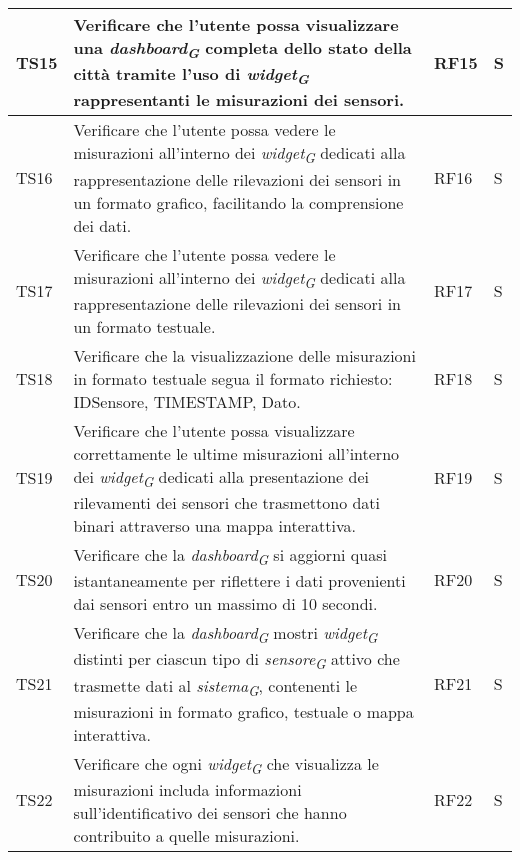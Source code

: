 \begin{longtable}{|C{1.9cm}|L{5cm}|C{2cm}|C{2cm}|}
    TS15 & Verificare che l'utente possa visualizzare una \textit{dashboard}\textsubscript{\textit{G}} completa dello stato della città tramite l'uso di \textit{widget}\textsubscript{\textit{G}} rappresentanti le misurazioni dei sensori. & RF15 & S \\
    \hline

    TS16 & Verificare che l'utente possa vedere le misurazioni all'interno dei \textit{widget}\textsubscript{\textit{G}} dedicati alla rappresentazione delle rilevazioni dei sensori in un formato grafico, facilitando la comprensione dei dati. & RF16 & S \\
    \hline

    TS17 & Verificare che l'utente possa vedere le misurazioni all'interno dei \textit{widget}\textsubscript{\textit{G}} dedicati alla rappresentazione delle rilevazioni dei sensori in un formato testuale. & RF17 & S \\
    \hline

    TS18 & Verificare che la visualizzazione delle misurazioni in formato testuale segua il formato richiesto: IDSensore, TIMESTAMP, Dato. & RF18 & S \\
    \hline

    TS19 & Verificare che l'utente possa visualizzare correttamente le ultime misurazioni all'interno dei \textit{widget}\textsubscript{\textit{G}} dedicati alla presentazione dei rilevamenti dei sensori che trasmettono dati binari attraverso una mappa interattiva. & RF19 & S \\
    \hline

    TS20 & Verificare che la \textit{dashboard}\textsubscript{\textit{G}} si aggiorni quasi istantaneamente per riflettere i dati provenienti dai sensori entro un massimo di 10 secondi. & RF20 & S \\
    \hline

    TS21 & Verificare che la \textit{dashboard}\textsubscript{\textit{G}} mostri \textit{widget}\textsubscript{\textit{G}} distinti per ciascun tipo di \textit{sensore}\textsubscript{\textit{G}} attivo che trasmette dati al \textit{sistema}\textsubscript{\textit{G}}, contenenti le misurazioni in formato grafico, testuale o mappa interattiva. & RF21 & S \\
    \hline

    TS22 & Verificare che ogni \textit{widget}\textsubscript{\textit{G}} che visualizza le misurazioni includa informazioni sull'identificativo dei sensori che hanno contribuito a quelle misurazioni. & RF22 & S \\
    \hline


\end{longtable}

